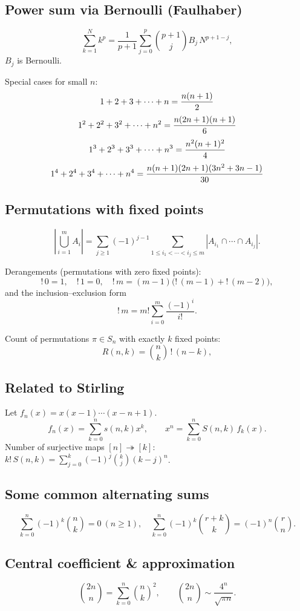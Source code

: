 \subsection*{Power sum via Bernoulli (Faulhaber)}
\[
\sum_{k=1}^{N} k^p=\frac{1}{p+1}\sum_{j=0}^{p}\binom{p+1}{j}B_j\,N^{p+1-j},
\]
\(B_j\) is Bernoulli.

Special cases for small $n$:
$$ 1 + 2 + 3 + \dots + n = \frac{n(n+1)}{2} \\$$ 
$$ 1^2 + 2^2 + 3^2 + \dots + n^2 = \frac{n(2n+1)(n+1)}{6} \\$$ 
$$ 1^3 + 2^3 + 3^3 + \dots + n^3 = \frac{n^2(n+1)^2}{4} \\$$ 
$$ 1^4 + 2^4 + 3^4 + \dots + n^4 = \frac{n(n+1)(2n+1)(3n^2 + 3n - 1)}{30} \\$$


\subsection*{Permutations with fixed points}
\[
\left|\bigcup_{i=1}^m A_i\right|
=\sum_{j\ge1}(-1)^{j-1}\!\!\sum_{1\le i_1<\cdots<i_j\le m}\!\!\!\!\!\!\!\!\! |A_{i_1}\cap\cdots\cap A_{i_j}|.
\]

Derangements (permutations with zero fixed points):
\[
!\,0=1,\quad !\,1=0,\quad !\,m=(m-1)\big(!\,(m-1)+!\,(m-2)\big),
\]
and the inclusion–exclusion form
\[
!\,m=m!\sum_{i=0}^{m}\frac{(-1)^i}{i!}.
\]

Count of permutations $\pi\in S_n$ with exactly $k$ fixed points:
\[
R(n,k)=\binom{n}{k}\,!\,(n-k),
\]

\subsection*{Related to Stirling}
Let \(f_n(x)=x(x-1)\cdots(x-n+1)\).
\[
f_n(x)=\sum_{k=0}^n s(n,k)x^k,\qquad
x^n=\sum_{k=0}^n S(n,k)\,f_k(x).
\]
Number of surjective maps \( [n]\twoheadrightarrow [k] \): \(\displaystyle k!\,S(n,k)=\sum_{j=0}^{k}(-1)^j\binom{k}{j}(k-j)^n\).

\subsection*{Some common alternating sums}
\[
\sum_{k=0}^n (-1)^k \binom{n}{k} = 0\ (n\ge1),\quad
\sum_{k=0}^n (-1)^k \binom{r+k}{k} = (-1)^n \binom{r}{n}.
\]

\subsection*{Central coefficient \& approximation}
\[
\binom{2n}{n}=\sum_{k=0}^n \binom{n}{k}^2,\qquad
\binom{2n}{n}\sim \frac{4^n}{\sqrt{\pi n}}.
\]